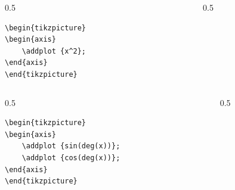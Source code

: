 \documentclass[12pt,aspectratio=169,ignorenonframetext]{ltxbeamer}
\begin{document}
\begin{frame}[fragile]
\begin{columns}
    \begin{column}{0.5\textwidth}
        \begin{verbatim}
\begin{tikzpicture}
\begin{axis}
    \addplot {x^2};
\end{axis}
\end{tikzpicture}
        \end{verbatim}
    \end{column}
    {\color{gray} \vline}
    \begin{column}{0.5\textwidth}
    \end{column}
\end{columns}
\end{frame}





\begin{frame}[fragile]
\begin{columns}
    \begin{column}{0.5\textwidth}
        \begin{verbatim}
\begin{tikzpicture}
\begin{axis}
    \addplot {sin(deg(x))};
    \addplot {cos(deg(x))};
\end{axis}
\end{tikzpicture}
        \end{verbatim}
    \end{column}
    {\color{gray} \vline}
    \begin{column}{0.5\textwidth}
    \end{column}
\end{columns}
\end{frame}
\end{document}
